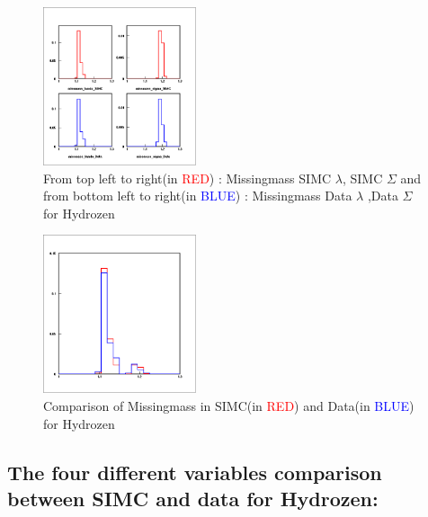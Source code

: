 \documentclass[aps,11pt]{revtex4}
\begin{document}
\newpage
\begin{figure}[h]
	\centering
		\includegraphics[width=0.40\textwidth]{missmass2.png}
	\caption{From top left to right(in \textcolor{red}{RED}) : Missingmass SIMC $\lambda$, SIMC $\Sigma$ and from bottom left to right(in \textcolor{blue}{BLUE}) : Missingmass Data $\lambda$  ,Data $\Sigma$ for Hydrozen}
	\label{fig:missmass2}
\end{figure}
\begin{figure}[h]
	\centering
		\includegraphics[width=0.40\textwidth]{missmass3.png}
	\caption{Comparison of Missingmass in SIMC(in \textcolor{red}{RED}) and Data(in \textcolor{blue}{BLUE}) for Hydrozen}
	\label{fig:missmass3}
\end{figure}

\newpage
\subsection{The four different variables comparison between SIMC and data for Hydrozen:}
\label{sec:The four different variables comparison between SIMC and data for Hydrozen:}
\end{document}

